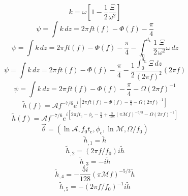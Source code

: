\begin{equation}
    k=\omega[1-\frac{1}{2}\frac{\Xi}{\omega^2}]
\end{equation}
\begin{equation}
    \psi=\int k\,d z=2\pi ft(f)-\Phi(f)-\frac{\pi}{4}
\end{equation}
\begin{equation}
    \psi=\int k\,d z=2\pi ft(f)-\Phi(f)-\frac{\pi}{4}-\int_0^{d_\text{L}} \frac{1}{2}\frac{\Xi}{\omega^2}\omega\,d z
\end{equation}
\begin{equation}
    \psi=\int k\,d z=2\pi ft(f)-\Phi(f)-\frac{\pi}{4}-\frac{1}{2}\frac{\int_0^{d_\text{L}}\Xi\,d z}{(2\pi f)^2}(2\pi f)
\end{equation}
\begin{equation}
    \psi=\int k\,d z=2\pi ft(f)-\Phi(f)-\frac{\pi}{4}-\Omega(2\pi f)^{-1}
\end{equation}
\begin{equation}
    \tilde{h}(f)=\mathcal{A} f^{-7/6}e^{i[2\pi ft(f)-\Phi(f)-\frac{\pi}{4}-\Omega(2\pi f)^{-1}]}
\end{equation}
\begin{equation}
    \tilde{h}(f)=\mathcal{A} f^{-7/6}e^{i[2\pi ft_\text{c}-\phi_\text{c}-\frac{\pi}{4}+\frac{3}{128}(\pi\mathcal{M}f)^{-5/3}-\Omega(2\pi f)^{-1}]}
\end{equation}
\begin{equation}
    \vec{\theta}=(\ln\mathcal{A},f_0t_\text{c},\phi_\text{c},\ln\mathcal{M},\Omega/f_0)
\end{equation}
\begin{equation}
    \tilde{h}_{,1}=\tilde{h}
\end{equation}
\begin{equation}
    \tilde{h}_{,2}=(2\pi f/f_0)i\tilde{h}
\end{equation}
\begin{equation}
    \tilde{h}_{,3}=-i\tilde{h}
\end{equation}
\begin{equation}
    \tilde{h}_{,4}=-\frac{5i}{128}(\pi\mathcal{M}f)^{-5/3}\tilde{h}
\end{equation}
\begin{equation}
    \tilde{h}_{,5}=-(2\pi f/f_0)^{-1}i\tilde{h}
\end{equation}
